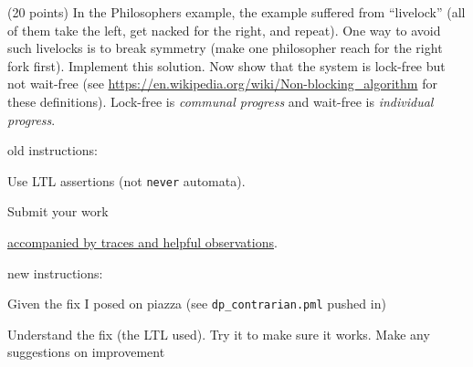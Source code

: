 \documentclass[11pt]{article}
\begin{document}
\begin{enumerate}
\begin{minipage}{\minpagw}
\end{minipage}

\clearpage

\item (20 points) In the Philosophers example, the example suffered
  from
  ``livelock'' (all of them take the left, get nacked for the right,
  and repeat).
  One way to avoid such livelocks is to break symmetry (make one philosopher
  reach for the right fork first).
  Implement this solution.
  Now show that the system is lock-free but not wait-free
  (see \url{https://en.wikipedia.org/wiki/Non-blocking_algorithm}
  for these definitions).
  Lock-free is {\em communal progress}
  and
  wait-free is {\em individual progress}.
  \begin{compactitem}
  \item old instructions:
    \begin{scriptsize}
      \begin{compactitem}
      \item  Use LTL assertions (not {\tt never} automata).

      \item  Submit your work
      \end{compactitem}
  \underline{accompanied by traces and helpful observations}.
  \end{scriptsize}

\item new instructions:
  \begin{compactitem}
  \item Given the fix I posed on piazza (see {\tt dp\_contrarian.pml} pushed in)
  \item Understand the fix (the LTL used). Try it to make sure it works. Make any suggestions on improvement
  \end{compactitem}
  \end{compactitem}
  
\begin{minipage}{\minpagw}
\end{minipage}


\end{enumerate}
\end{document}
